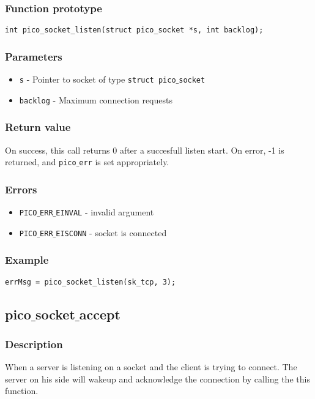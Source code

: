 \subsubsection*{Function prototype}
\begin{verbatim}
int pico_socket_listen(struct pico_socket *s, int backlog);
\end{verbatim}


\subsubsection*{Parameters}
\begin{itemize}[noitemsep]
\item \texttt{s} - Pointer to socket of type \texttt{struct pico$\_$socket}
\item \texttt{backlog} - Maximum connection requests
\end{itemize}

\subsubsection*{Return value}
On success, this call returns 0 after a succesfull listen start.
On error, -1 is returned, and \texttt{pico$\_$err} is set appropriately. 

\subsubsection*{Errors}
\begin{itemize}[noitemsep]
\item \texttt{PICO$\_$ERR$\_$EINVAL} - invalid argument
\item \texttt{PICO$\_$ERR$\_$EISCONN} - socket is connected
\end{itemize}

\subsubsection*{Example}
\begin{verbatim}
errMsg = pico_socket_listen(sk_tcp, 3);
\end{verbatim}


\subsection{pico$\_$socket$\_$accept}

\subsubsection*{Description}
When a server is listening on a socket and the client is trying to connect.
The server on his side will wakeup and acknowledge the connection by calling the this function.

